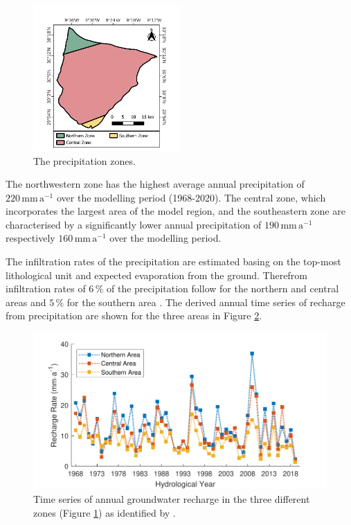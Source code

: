 \begin{figure}
    \vspace{-24pt}
    \centering
    \includegraphics[width=0.5\textwidth]{./img/Map_PrecipitationZones.pdf}
    \vspace{-18pt}
    \captionsetup{format=plain, labelfont=bf, textfont=it}
    \caption{The precipitation zones.}
    \vspace{-24pt}
    \label{Map-PrecZones}
\end{figure}
    
The northwestern zone has the highest average annual precipitation of \linebreak $220 \, \textrm{mm} \, \textrm{a}^{-1}$ over the modelling period (1968-2020). 
The central zone, which incorporates the largest area of the model region, and the southeastern zone are characterised by a significantly lower annual precipitation of $190 \, \textrm{mm} \, \textrm{a}^{-1}$ respectively $160 \, \textrm{mm} \, \textrm{a}^{-1}$ over the modelling period.

The infiltration rates of the precipitation are estimated basing on the top-most lithological unit and expected evaporation from the ground. 
Therefrom infiltration rates of $6 \, \%$ of the precipitation follow for the northern and central areas and $5 \, \%$ for the southern area \parencite{Resing.2008}. 
The derived annual time series of recharge from precipitation are shown for the three areas in Figure \ref{Fig-RechPrec}.

\begin{figure}[h]
    \centering
    \includegraphics{./img/Fig-PrecRecharge.pdf}
    \captionsetup{format=hang,labelfont=bf,textfont=it}
    \caption{Time series of annual groundwater recharge in the three different zones (Figure \ref{Map-PrecZones}) as identified by \textcite{Horn.2021}.}
    \label{Fig-RechPrec}
\end{figure}

